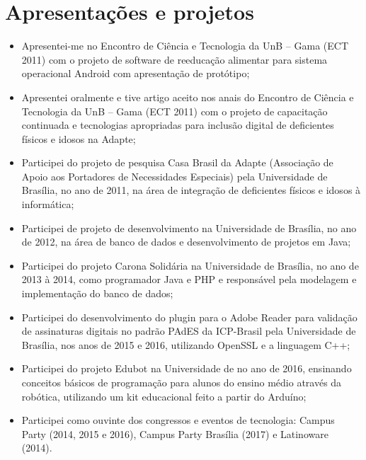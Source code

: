 \section{Apresentações e projetos}

\begin{itemize}
    \item Apresentei-me no Encontro de Ciência e Tecnologia da UnB – Gama (ECT 2011) com o projeto de software de reeducação alimentar para sistema operacional Android com apresentação de protótipo;
    \item Apresentei oralmente e tive artigo aceito nos anais do Encontro de Ciência e Tecnologia da UnB – Gama (ECT 2011) com o projeto de capacitação continuada e tecnologias apropriadas para inclusão digital de deficientes físicos e idosos na Adapte;
    \item Participei do projeto de pesquisa Casa Brasil da Adapte (Associação de Apoio aos Portadores de Necessidades Especiais) pela Universidade de Brasília, no ano de 2011, na área de integração de deficientes físicos e idosos à informática;
    \item Participei de projeto de desenvolvimento na Universidade de Brasília, no ano de 2012, na área de banco de dados e desenvolvimento de projetos em Java;
    \item Participei do projeto Carona Solidária na Universidade de Brasília, no ano de 2013 à 2014, como programador Java e PHP e responsável pela modelagem e implementação do banco de dados;
    \item Participei do desenvolvimento do plugin para o Adobe Reader para validação de assinaturas digitais no padrão PAdES da ICP-Brasil pela Universidade de Brasília, nos anos de 2015 e 2016, utilizando OpenSSL e a linguagem C++;
    \item Participei do projeto Edubot na Universidade de no ano de 2016, ensinando conceitos básicos de programação para alunos do ensino médio através da robótica, utilizando um kit educacional feito a partir do Arduíno;
    \item Participei como ouvinte dos congressos e eventos de tecnologia: Campus Party (2014, 2015 e 2016), Campus Party Brasília (2017) e Latinoware (2014).
\end{itemize}